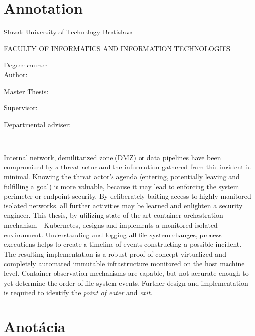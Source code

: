 
\thispagestyle{empty}

\section*{Annotation}

\begin{minipage}[t]{1\columnwidth}%
Slovak University of Technology Bratislava 

FACULTY OF INFORMATICS AND INFORMATION TECHNOLOGIES

Degree course: \myStudyProgram\\

Author: \myName

Master Thesis: \myTitle

Supervisor: \mySupervisor

Departmental adviser: \myDepartSupervisor

\myDate\\
\end{minipage}


Internal network, demilitarized zone (DMZ) or data pipelines have been compromised by a threat actor and the information gathered from this incident is minimal. Knowing the threat actor's agenda (entering, potentially leaving and fulfilling a goal) is more valuable, because it may lead to enforcing the system perimeter or endpoint security. By deliberately baiting access to highly monitored isolated networks, all further activities may be learned and enlighten a security engineer. This thesis, by utilizing state of the art container orchestration mechanism - Kubernetes, designs and implements a monitored isolated environment. Understanding and logging all file system changes, process executions helps to create a timeline of events constructing a possible incident. The resulting implementation is a robust proof of concept virtualized and completely automated immutable infrastructure monitored on the host machine level. Container observation mechanisms are capable, but not accurate enough to yet determine the order of file system events. Further design and implementation is required to identify the \textit{point of enter} and \textit{exit}.


\newpage{}\thispagestyle{empty}

\newpage
\thispagestyle{empty}
\mbox{}
\newpage

\thispagestyle{empty}
\section*{Anotácia}

